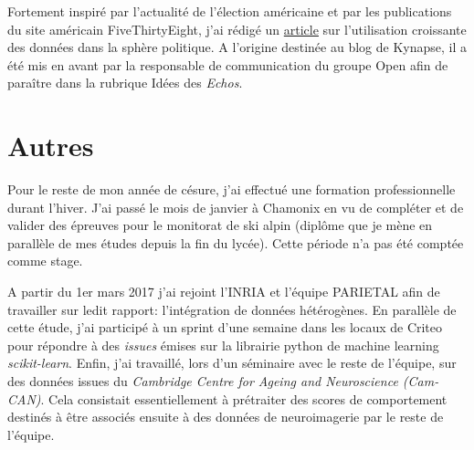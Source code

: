 \documentclass[a4paper]{article}
\begin{document}
	Fortement inspiré par l'actualité de l'élection américaine et par les publications du site américain FiveThirtyEight, j'ai rédigé un \href{https://www.lesechos.fr/idees-debats/cercle/cercle-162105-big-data-trump-2039427.php}{article} sur l'utilisation croissante des données dans la sphère politique. A l'origine destinée au blog de Kynapse, il a été mis en avant par la responsable de communication du groupe Open afin de paraître dans la rubrique Idées des \textit{Echos}. 
	
	\section{Autres}
	
	Pour le reste de mon année de césure, j'ai effectué une formation professionnelle durant l'hiver. J'ai passé le mois de janvier à Chamonix en vu de compléter et de valider des épreuves pour le monitorat de ski alpin (diplôme que je mène en parallèle de mes études depuis la fin du lycée). Cette période n'a pas été comptée comme stage.
	
	A partir du 1er mars 2017 j'ai rejoint l'INRIA et l'équipe PARIETAL afin de travailler sur ledit rapport: l'intégration de données hétérogènes. En parallèle de cette étude, j'ai participé à un sprint d'une semaine dans les locaux de Criteo pour répondre à des \emph{issues} émises sur la librairie python de machine learning \emph{scikit-learn}. Enfin, j'ai travaillé, lors d'un séminaire avec le reste de l'équipe, sur des données issues du \emph{Cambridge Centre for Ageing and Neuroscience (Cam-CAN)}. Cela consistait essentiellement à prétraiter des scores de comportement destinés à être associés ensuite à des données de neuroimagerie par le reste de l'équipe.
\end{document}
